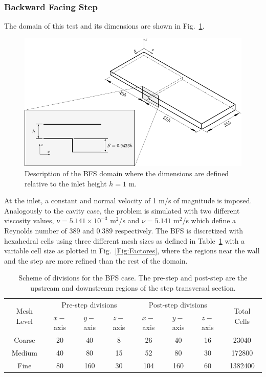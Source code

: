 \documentclass[final,3p,times,11pt,onecolumn]{myElsarticle}
\numberwithin{equation}{section}
\begin{document}
\subsubsection{Backward Facing Step}
The domain of this test and its dimensions are shown in Fig.~\ref{Fig:Geometria3}.
\begin{figure}[t!!!]
\centering
\includegraphics[width=12cm]{fig/Cases/Geometria3.pdf}
\caption{Description of the BFS domain where the dimensions are defined relative to the inlet height $h = 1$ m.}
\label{Fig:Geometria3}
\end{figure}
At the inlet, a constant and normal velocity of 1 m/s of magnitude is imposed. Analogously to the cavity case, the problem is simulated with two different viscosity values, $\nu = 5.141 \times 10^{-3}$ m$^2$/s and $\nu = 5.141$ m$^2$/s which define a Reynolds number of 389 and $0.389$ respectively. The BFS is discretized with hexahedral cells using three different mesh sizes as defined in Table~\ref{Table:BFSMeshes} with a variable cell size as plotted in Fig.~\ref{Fig:Factores}, where the regions near the wall and the step are more refined than the rest of the domain.
\begin{table}[b!]
\centering
\begin{tabular}{cccccccc}
\hline 
\multirow{2}{1cm}{Mesh Level} & \multicolumn{3}{c}{Pre-step divisions} & \multicolumn{3}{c}{Post-step divisions} & \multirow{2}{1cm}{Total Cells} \\ 
\cline{2-7} 
&  $x-$axis &  $y-$axis &  $z-$axis &  $x-$axis &  $y-$axis &  $z-$axis \\ 
\hline 
Coarse & 20 & 40 & 8 & 26 & 40 & 16 & 23040 \\ 
Medium & 40 & 80 & 15 & 52 & 80 & 30 & 172800 \\ 
Fine & 80 & 160 & 30 & 104 & 160 & 60 & 1382400 \\ 
\hline 
\end{tabular}
\caption{Scheme of divisions for the BFS case. The pre-step and post-step are the upstream and downstream regions of the step transversal section.}
\label{Table:BFSMeshes}
\end{table}
\end{document}
